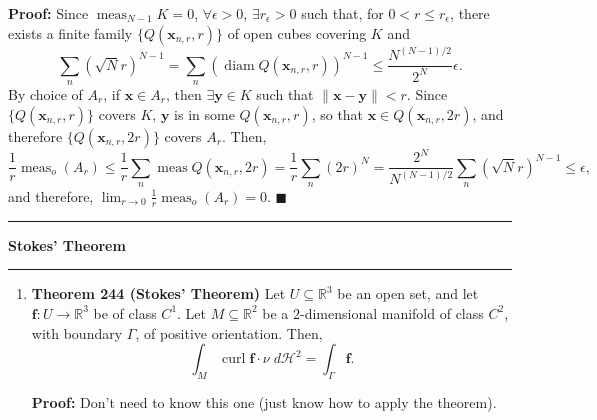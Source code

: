 \documentclass[11pt]{article}
\renewcommand{\qed}{\quad $\blacksquare$}
\newcommand{\meas}{\operatorname{meas}}
\newcommand{\diam}{\operatorname{diam}}
\newcommand{\curl}{\operatorname{curl}}
\newcommand{\bx}{\mathbf{x}}
\newcommand{\by}{\mathbf{y}}
\newcommand{\bff}{\mathbf{f}}
\begin{document}
\begin{enumerate}
{\bf Proof:} Since $\meas_{N - 1} K = 0$, $\forall \epsilon > 0$,
$\exists r_{\epsilon} > 0$ such that, for $0 < r \leq r_{\epsilon}$, there
exists a finite family $\{Q(\bx_{n,r},r)\}$ of open cubes covering $K$ and
\[\sum_n \left(\sqrt{N}r\right)^{N - 1}
 = \sum_n (\diam Q(\bx_{n,r},r))^{N - 1}
 \leq \frac{N^{(N - 1)/2}}{2^N}\epsilon.\]
By choice of $A_r$, if $\bx \in A_r$, then $\exists \by \in K$ such that
$\|\bx - \by\| < r$. Since $\{Q(\bx_{n,r},r)\}$ covers $K$, $\by$ is in some
$Q(\bx_{n,r},r)$, so that $\bx \in Q(\bx_{n,r},2r)$, and therefore
$\{Q(\bx_{n,r},2r)\}$ covers $A_r$. Then,
\[\frac{1}{r}\meas_o(A_r)
 \leq \frac{1}{r}\sum_n\meas Q(\bx_{n,r},2r)
 = \frac{1}{r} \sum_n (2r)^N
 = \frac{2^N}{N^{(N - 1)/2}}\sum_n \left(\sqrt{N}r\right)^{N - 1}
 \leq \epsilon,\]
and therefore, $\lim_{r \rightarrow 0} \frac{1}{r} \meas_o (A_r) = 0$. \qed
\end{enumerate}

\hrule
{\Large \bf Stokes' Theorem}
\vspace{1mm}
\hrule
\begin{enumerate}
\item \textbf{Theorem 244 (Stokes' Theorem)}
Let $U \subseteq \mathbb{R}^3$ be an open set, and let
$\bff: U \rightarrow \mathbb{R}^3$ be of class $C^1$. Let
$M \subseteq \mathbb{R}^2$ be a $2$-dimensional manifold of class $C^2$,
with boundary $\Gamma$, of positive orientation. Then,
\[\int_M \curl \bff \cdot \nu \; d\mathcal{H}^2 = \int_{\Gamma} \bff.\]

{\bf Proof:} Don't need to know this one (just know how to apply the theorem).

\end{enumerate}
\end{document}
